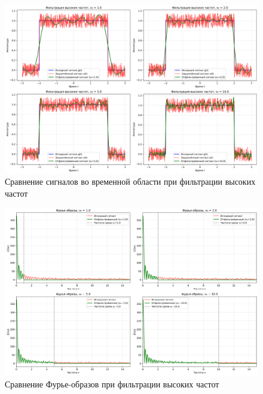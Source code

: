 \begin{figure}[H]
\centering
\includegraphics[width=\textwidth]{images/task1/high_freq_filter_time_domain.png}
\caption{Сравнение сигналов во временной области при фильтрации высоких частот}
\end{figure}

\begin{figure}[H]
\centering
\includegraphics[width=\textwidth]{images/task1/high_freq_filter_freq_domain.png}
\caption{Сравнение Фурье-образов при фильтрации высоких частот}
\end{figure}

